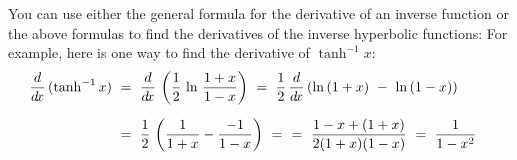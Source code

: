 \noindent You can use either the general formula for the derivative of an
inverse function or the above formulas to find the derivatives of the inverse
hyperbolic functions:
\newpage
{}
For example, here is one way to find the derivative of $\tanh^{-1} x$:
\begin{align*}
\frac{d}{d\!x}\,(\tanh^{-1} x) ~&=~ \frac{d}{d\!x}\,\left(\frac{1}{2}\,\ln\,\frac{1+x}{1-x}\right) ~=~
\frac{1}{2}\,\frac{d}{d\!x}\,(\ln\,(1+x) ~-~ \ln\,(1-x))\\[6pt]
&=~ \frac{1}{2}\,\left(\frac{1}{1+x} - \frac{-1}{1-x}\right) ~=~
~=~ \frac{1-x + (1+x)}{2 (1+x)(1-x)} ~=~ \frac{1}{1-x^2} \quad\relax
\end{align*}\vspace{-5mm}

